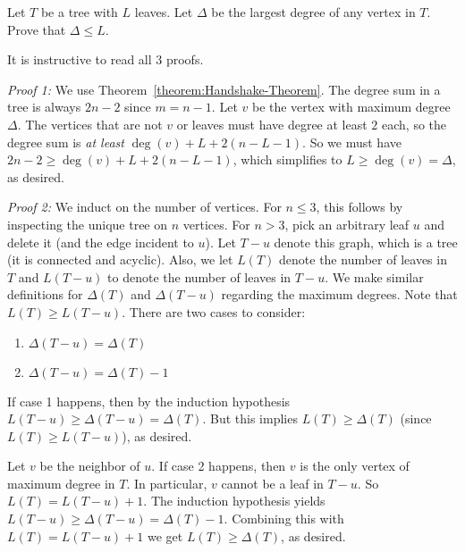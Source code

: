 \begin{flex}
\begin{exercise} \label{exercise:Max-degree-is-at-most-number-of-leaves}
Let $T$ be a tree with $L$ leaves. Let $\Delta$ be the largest degree of any vertex in $T$. Prove that $\Delta \leq L$.
\end{exercise}

\begin{solution}
It is instructive to read all 3 proofs.

\noindent
\emph{Proof 1:} We use Theorem~\ref{theorem:Handshake-Theorem}. The degree sum in a tree is always $2n - 2$ since $m = n-1$. Let $v$ be the vertex with maximum degree $\Delta$. The vertices that are not $v$ or leaves must have degree at least $2$ each, so the degree sum is \emph{at least} $\deg(v) + L + 2(n - L - 1)$. So we must have $2n - 2  \geq \deg(v) + L + 2(n - L - 1)$, which simplifies to $L \geq \deg(v) = \Delta$, as desired.

\noindent
\emph{Proof 2:} We induct on the number of vertices. For $n \leq 3$, this follows by inspecting the unique tree on $n$ vertices. For $n > 3$, pick an arbitrary leaf $u$ and delete it (and the edge incident to $u$). Let $T - u$ denote this graph, which is a tree (it is connected and acyclic). Also, we let $L(T)$ denote the number of leaves in $T$ and $L(T-u)$ to denote the number of leaves in $T-u$. We make similar definitions for $\Delta(T)$ and $\Delta(T-u)$ regarding the maximum degrees. Note that  $L(T) \geq L(T - u)$. There are two cases to consider:
\begin{enumerate}
    \item $\Delta(T - u) = \Delta(T)$ 
    \item $\Delta(T - u) = \Delta(T) - 1$
\end{enumerate}
If case 1 happens, then by the induction hypothesis $L(T - u) \geq \Delta(T-u) = \Delta(T)$. But this implies $L(T) \geq \Delta(T)$ (since $L(T) \geq L(T - u)$), as desired.

Let $v$ be the neighbor of $u$. If case 2 happens, then $v$ is the only vertex of maximum degree in $T$. In particular, $v$ cannot be a leaf in $T-u$. So $L(T) = L(T - u) + 1$. The induction hypothesis yields $L(T - u) \geq \Delta(T-u) = \Delta(T) - 1$. Combining this with $L(T) = L(T - u) + 1$ we get $L(T) \geq \Delta(T)$, as desired.


\end{solution}
\end{flex}
